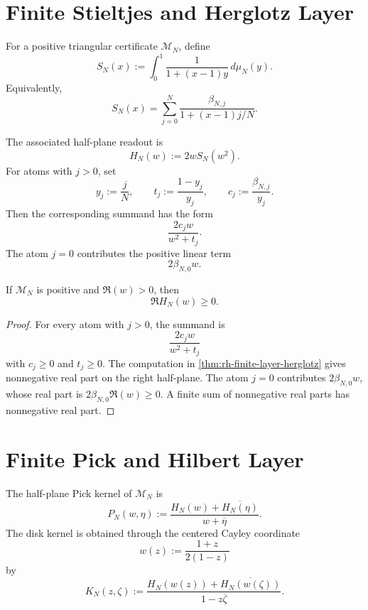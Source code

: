 \section{Finite Stieltjes and Herglotz Layer}
\label{sec:rh-xi-triangular-stieltjes-herglotz}

\begin{definition}
\label{def:rh-triangular-finite-stieltjes-readout}
For a positive triangular certificate $\mathcal M_N$, define
$$
S_N(x)
:=
\int_0^1
\frac{1}{1+(x-1)y}
\,d\mu_N(y).
$$
Equivalently,
$$
S_N(x)
=
\sum_{j=0}^{N}
\frac{\beta_{N,j}}{1+(x-1)j/N}.
$$
\end{definition}

\begin{definition}
\label{def:rh-triangular-finite-herglotz-readout}
The associated half-plane readout is
$$
H_N(w)
:=
2wS_N(w^2).
$$
For atoms with $j>0$, set
$$
y_j:=\frac{j}{N},
\qquad
t_j:=\frac{1-y_j}{y_j},
\qquad
c_j:=\frac{\beta_{N,j}}{y_j}.
$$
Then the corresponding summand has the form
$$
\frac{2c_jw}{w^2+t_j}.
$$
The atom $j=0$ contributes the positive linear term
$$
2\beta_{N,0}w.
$$
\end{definition}

\begin{theorem}
\label{thm:rh-triangular-herglotz-positivity}
If $\mathcal M_N$ is positive and $\Re(w)>0$, then
$$
\Re H_N(w)\ge0.
$$
\end{theorem}

\begin{proof}
For every atom with $j>0$, the summand is
$$
\frac{2c_jw}{w^2+t_j}
$$
with $c_j\ge0$ and $t_j\ge0$. The computation in
\autoref{thm:rh-finite-layer-herglotz} gives nonnegative real part on
the right half-plane. The atom $j=0$ contributes
$2\beta_{N,0}w$, whose real part is
$2\beta_{N,0}\Re(w)\ge0$. A finite sum of nonnegative real parts has
nonnegative real part.
\end{proof}

\section{Finite Pick and Hilbert Layer}
\label{sec:rh-xi-triangular-pick-hilbert}

\begin{definition}
\label{def:rh-triangular-finite-pick-kernel}
The half-plane Pick kernel of $\mathcal M_N$ is
$$
P_N(w,\eta)
:=
\frac{H_N(w)+\overline{H_N(\eta)}}{w+\overline{\eta}}.
$$
The disk kernel is obtained through the centered Cayley coordinate
$$
w(z):=\frac{1+z}{2(1-z)}
$$
by
$$
K_N(z,\zeta)
:=
\frac{H_N(w(z))+\overline{H_N(w(\zeta))}}
{1-z\overline{\zeta}}.
$$
\end{definition}

